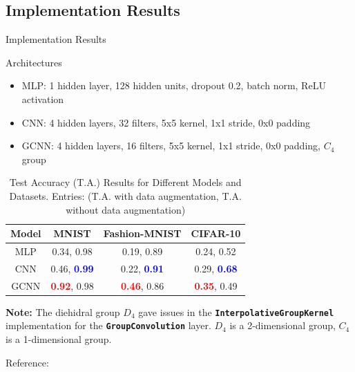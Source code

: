 \documentclass[9pt,dvipsnames]{beamer}
\begin{document}
\subsection{Implementation Results}
\begin{frame}{Implementation Results}

\begin{block}{Architectures}

	\begin{itemize}
		\item MLP: 1 hidden layer, 128 hidden units, dropout 0.2, batch norm, ReLU activation
		\item CNN: 4 hidden layers, 32 filters, 5x5 kernel, 1x1 stride, 0x0 padding
		\item GCNN: 4 hidden layers, 16 filters, 5x5 kernel, 1x1 stride, 0x0 padding, $C_4$ group
	\end{itemize}

\end{block}

\begin{table}[h]
\centering
\begin{tabular}{|c|c|c|c|}
\hline
\textbf{Model} & \textbf{MNIST} & \textbf{Fashion-MNIST} & \textbf{CIFAR-10} \\
\hline
MLP & 0.34, 0.98 & 0.19, 0.89 & 0.24, 0.52 \\
\hline
CNN & 0.46, \textcolor{blue}{\textbf{0.99}} & 0.22, \textcolor{blue}{\textbf{0.91}} & 0.29, \textcolor{blue}{\textbf{0.68}} \\
\hline
GCNN & \textcolor{red}{\textbf{0.92}}, 0.98 & \textcolor{red}{\textbf{0.46}}, 0.86 & \textcolor{red}{\textbf{0.35}}, 0.49 \\
\hline
\end{tabular}
\caption{Test Accuracy (T.A.) Results for Different Models and Datasets. Entries: (T.A. with data augmentation, T.A. without data augmentation)}
\label{tab:test_accuracy_results}
\end{table}

\textbf{Note:} The diehidral group $D_4$ gave issues in the \textbf{\texttt{InterpolativeGroupKernel}} implementation for the \textbf{\texttt{GroupConvolution}} layer. $D_4$ is a 2-dimensional group, $C_4$ is a 1-dimensional group.

\vspace{0.3cm}
Reference: \cite{knigge_gdl_2024}

\end{frame}
\end{document}

